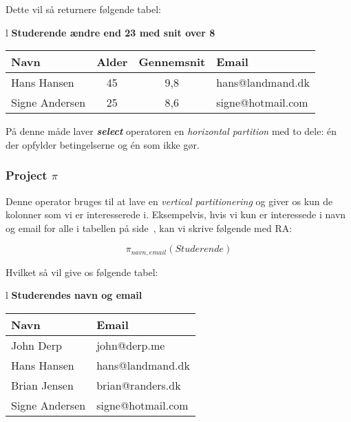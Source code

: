 Dette vil så returnere følgende tabel:

\begin{center}
	\begin{tabular}{l}
		\textbf{\large Studerende ændre end 23 med snit over 8}	\\
		\begin{tabular}{|l|c|c|l|}
			\hline
			\textbf{Navn}&\textbf{Alder}&\textbf{Gennemsnit}&\textbf{Email}\\
			\hline
			Hans Hansen	& 45 & 9,8	& hans@landmand.dk		\\
			\hline
			Signe Andersen	& 25 & 8,6	& signe@hotmail.com		\\
			\hline
		\end{tabular}
	\end{tabular}
\end{center}

På denne måde laver \textbf{\textit{select}} operatoren en \textit{horizontal partition} med to dele: én der opfylder betingelserne og én som ikke gør.

\subsubsection{Project $\pi$}

Denne operator bruges til at lave en \textit{vertical partitionering} og giver os kun de kolonner som vi er interesserede i. Eksempelvis, hvis vi kun er interessede i navn og email for alle i tabellen på side~\pageref{tab:stud}, kan vi skrive følgende med RA:

\begin{equation}
\pi_{navn, email}(Studerende)
\end{equation}

Hvilket så vil give os følgende tabel:

\begin{center}
	\begin{tabular}{l}\label{tab:stud}
		\textbf{\large Studerendes navn og email}	\\
		\begin{tabular}{|l|l|}		
			\hline
			\textbf{Navn}&\textbf{Email}\\
			\hline
			John Derp		&  john@derp.me		\\
			\hline
			Hans Hansen		&  hans@landmand.dk		\\
			\hline
			Brian Jensen	&  brian@randers.dk		\\
			\hline
			Signe Andersen	& signe@hotmail.com		\\
			\hline
		\end{tabular}
	\end{tabular}
\end{center}


